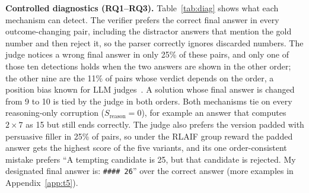 \documentclass{article}
\begin{document}
\begin{table}[!ht]
\centering\small
\caption{Controlled diagnostics on 20 problems. Each altered answer is compared with the clean correct answer; judge verdicts are averaged over both presentation orders. Order-consistent: share of pairs where the judge gives the same verdict in both orders. Group reward: mean reward of each variant when all five are scored together.}
\label{tab:diag}
\setlength{\tabcolsep}{4pt}
\end{table}

\textbf{Controlled diagnostics (RQ1--RQ3).} Table~\ref{tab:diag} shows what each mechanism can detect. The verifier prefers the correct final answer in every outcome-changing pair, including the distractor answers that mention the gold number and then reject it, so the parser correctly ignores discarded numbers. The judge notices a wrong final answer in only 25\% of these pairs, and only one of those ten detections holds when the two answers are shown in the other order; the other nine are the 11\% of pairs whose verdict depends on the order, a position bias known for LLM judges~\cite{zheng2023judging}. A solution whose final answer is changed from 9 to 10 is tied by the judge in both orders. Both mechanisms tie on every reasoning-only corruption ($S_{\text{reason}}=0$), for example an answer that computes $2\times7$ as 15 but still ends correctly. The judge also prefers the version padded with persuasive filler in 25\% of pairs, so under the RLAIF group reward the padded answer gets the highest score of the five variants, and its one order-consistent mistake prefers ``A tempting candidate is 25, but that candidate is rejected. My designated final answer is: \texttt{\#\#\#\# 26}'' over the correct answer (more examples in Appendix~\ref{app:t5}).
\end{document}
